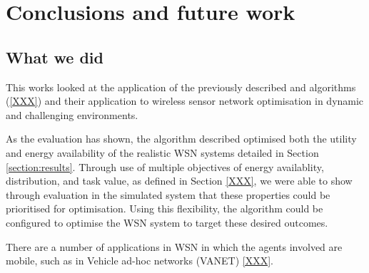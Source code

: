 \section{Conclusions and future work}
\label{section:conclusions}

\subsection{What we did}
This works looked at the application of the previously described \acronymATARIA{}{} and \acronymMGRAO{}{} algorithms (\ref{XXX}) and their application to wireless sensor network optimisation in dynamic and challenging environments.

As the evaluation has shown, the algorithm described optimised both the utility and energy availability of the realistic WSN systems detailed in Section \ref{section:results}. Through use of multiple objectives of energy availablity, distribution, and task value, as defined in Section \ref{XXX}, we were able to show through evaluation in the simulated system that these properties could be prioritised for optimisation. Using this flexibility, the algorithm could be configured to optimise the WSN system to target these desired outcomes.
 
There are a number of applications in WSN in which the agents involved are mobile, such as in Vehicle ad-hoc networks (VANET) \ref{XXX}. 


  